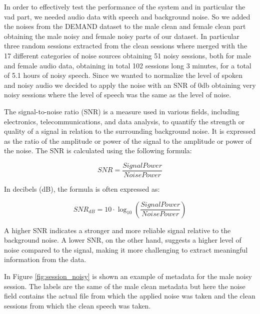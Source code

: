 \documentclass[../main.tex]{subfiles}
\begin{document}
In order to effectively test the performance of the system and in particular the vad part, we needed audio data with speech and background noise. So we added the noises from the DEMAND dataset to the male clean and female clean part obtaining the male noisy and female noisy parts of our dataset. In particular three random sessions extracted from the clean sessions where merged with the 17 different categories of noise sources obtaining 51 noisy sessions, both for male and female audio data, obtaining in total 102 sessions long 3 minutes, for a total of 5.1 hours of noisy speech. Since we wanted to normalize the level of spoken and noisy audio we decided to apply the noise with an SNR of 0db obtaining very noisy sessions where the level of speech was the same as the level of noise. 

The signal-to-noise ratio (SNR) is a measure used in various fields, including electronics, telecommunications, and data analysis, to quantify the strength or quality of a signal in relation to the surrounding background noise. It is expressed as the ratio of the amplitude or power of the signal to the amplitude or power of the noise. The SNR is calculated using the following formula:

\[ SNR = \frac{Signal Power}{Noise Power} \]
 
In decibels (dB), the formula is often expressed as:

\[ SNR_{{dB}} = 10 \cdot \log_{10}\left(\frac{Signal Power}{Noise Power}\right) \]


A higher SNR indicates a stronger and more reliable signal relative to the background noise. A lower SNR, on the other hand, suggests a higher level of noise compared to the signal, making it more challenging to extract meaningful information from the data.

In Figure \ref*{fig:session_noisy} is shown an example of metadata for the male noisy session. The labels are the same of the male clean metadata but here the noise field contains the actual file from which the applied noise was taken and the clean sessions from which the clean speech was taken. 
\end{document}
